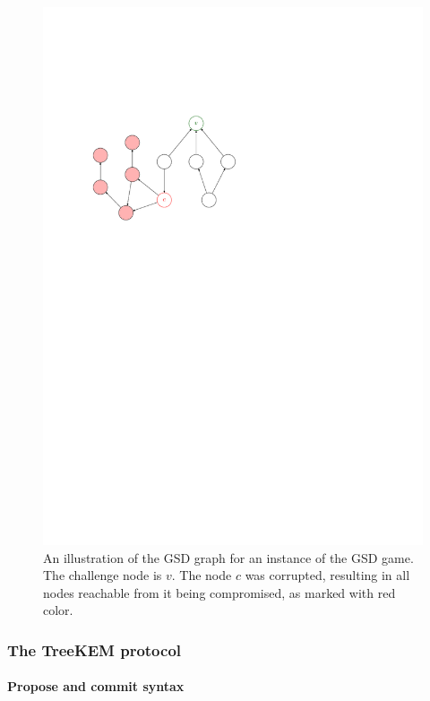 \begin{figure}
	\begin{center}
		\includegraphics{figures/gsd-example}
	\end{center}
	\caption{An illustration of the GSD graph for an instance of the GSD game. The challenge node is $v$. The node $c$ was corrupted, resulting in all nodes reachable from it being compromised, as marked with red color.} \label{fig:gsd-example}
\end{figure}

\subsubsection{The TreeKEM protocol} \label{sec:treekem-overview}

\paragraph{Propose and commit syntax}

